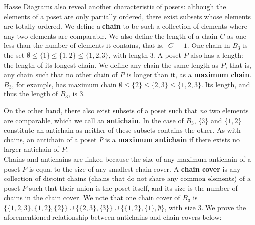 \documentclass{article} %
\theoremstyle{definition}
\theoremstyle{plain}
\begin{document}
Hasse Diagrams also reveal another characteristic of posets: although the elements of a poset are only partially ordered, there exist subsets whose elements are totally ordered. We define a \textbf{chain} to be such a collection of elements where any two elements are comparable. We also define the length of a chain $C$ as one less than the number of elements it contains, that is, $|C|-1$. One chain in $B_3$ is the set $\emptyset \leq \{1\} \leq \{1,2\} \leq \{1,2,3\}$, with length 3. A poset $P$ also has a length: the length of its longest chain. We define any chain the same length as $P$, that is, any chain such that no other chain of $P$ is longer than it, as a \textbf{maximum chain}. $B_3$, for example, has maximum chain $\emptyset \leq \{2\} \leq \{2,3\} \leq \{1,2,3\}$. Its length, and thus the length of $B_3$, is 3.\

On the other hand, there also exist subsets of a poset such that \textit{no} two elements are comparable, which we call an \textbf{antichain}. In the case of $B_3$, $\{3\}$ and $\{1,2\}$ constitute an antichain as neither of these subsets contains the other. As with chains, an antichain of a poset $P$ is a \textbf{maximum antichain} if there exists no larger antichain of $P$. \\

Chains and antichains are linked because the size of any maximum antichain of a poset $P$ is equal to the size of any smallest chain cover. A \textbf{chain cover} is any collection of disjoint chains (chains that do not share any common elements) of a poset $P$ such that their union is the poset itself, and its size is the number of chains in the chain cover. We note that one chain cover of $B_{3}$ is $\{\{1,2,3\}, \{1,2\}, \{2\}\} \cup \{ \{2,3\}, \{3\} \} \cup \{\{1,2\}, \{1\}, \emptyset \}$, with size 3. We prove the aforementioned relationship between antichains and chain covers below:
\end{document}
